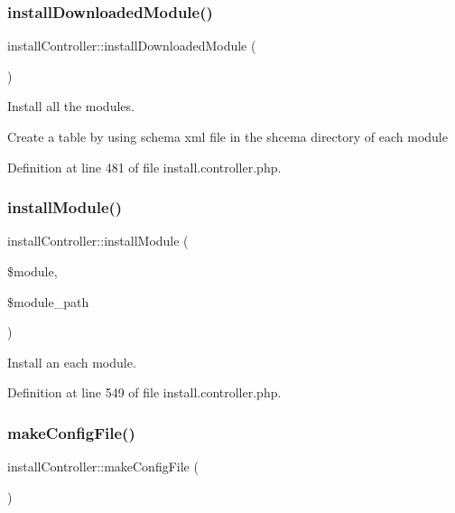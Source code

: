 \subsubsection{\texorpdfstring{install\+Downloaded\+Module()}{installDownloadedModule()}}
{\footnotesize\ttfamily install\+Controller\+::install\+Downloaded\+Module (\begin{DoxyParamCaption}{ }\end{DoxyParamCaption})}



Install all the modules. 

Create a table by using schema xml file in the shcema directory of each module 

Definition at line 481 of file install.\+controller.\+php.

\hypertarget{classinstallController_a97c582da1e115f0db5256f02d22efc88}{}\label{classinstallController_a97c582da1e115f0db5256f02d22efc88} 
\subsubsection{\texorpdfstring{install\+Module()}{installModule()}}
{\footnotesize\ttfamily install\+Controller\+::install\+Module (\begin{DoxyParamCaption}\item[{}]{\$module,  }\item[{}]{\$module\+\_\+path }\end{DoxyParamCaption})}



Install an each module. 



Definition at line 549 of file install.\+controller.\+php.

\hypertarget{classinstallController_a1ccad92dd450d67e90a2efdde0f6b78a}{}\label{classinstallController_a1ccad92dd450d67e90a2efdde0f6b78a} 
\subsubsection{\texorpdfstring{make\+Config\+File()}{makeConfigFile()}}
{\footnotesize\ttfamily install\+Controller\+::make\+Config\+File (\begin{DoxyParamCaption}{ }\end{DoxyParamCaption})}



